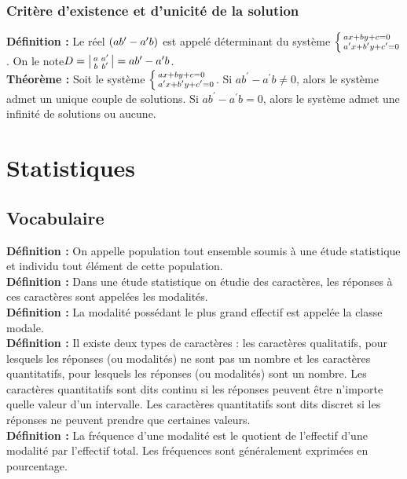 \documentclass[a4paper,titlepage]{article}
\let\oldsection\section
\renewcommand\section{\clearpage\oldsection}
\let\oldleft\left
\renewcommand{\left}{\mathopen{}\mathclose\bgroup\oldleft}
\let\oldright\right
\renewcommand{\right}{\aftergroup\egroup\oldright}
\begin{document}
        \subsubsection{Critère d’existence et d’unicité de la solution}
            \textbf{Définition :} Le réel $\left(ab^{\prime}-a^{\prime}b\right)$ est appelé déterminant du système $\left\{\begin{smallmatrix*}[l]ax+by+c=0\\a^{\prime}x+b^{\prime}y+c^{\prime}=0\end{smallmatrix*}\!\right.$. On le note\linebreak$D=\left|\begin{smallmatrix}a&a^{\prime}\\b&b^{\prime}\end{smallmatrix}\right|=ab^{\prime}-a^{\prime}b$.
            \\
            \textbf{Théorème :} Soit le système $\left\{\begin{smallmatrix*}[l]ax+by+c=0\\a^{\prime}x+b^{\prime}y+c^{\prime}=0\end{smallmatrix*}\!\right.$. Si $ab^{\prime}-a^{\prime}b\neq0$, alors le système admet un unique couple de solutions. Si $ab^{\prime}-a^{\prime}b=0$, alors le système admet une infinité de solutions ou aucune.
\section{Statistiques}
    \subsection{Vocabulaire}
        \textbf{Définition :} On appelle population tout ensemble soumis à une étude statistique et individu tout élément de cette population.
        \\
        \textbf{Définition :} Dans une étude statistique on étudie des caractères, les réponses à ces caractères sont appelées les modalités.
        \\
        \textbf{Définition :} La modalité possédant le plus grand effectif est appelée la classe modale.
        \\
        \textbf{Définition :}  Il existe deux types de caractères : les caractères qualitatifs, pour lesquels les réponses (ou modalités) ne sont pas un nombre et les caractères quantitatifs, pour lesquels les réponses (ou modalités) sont un nombre. Les caractères quantitatifs sont dits continu si les réponses peuvent être n’importe quelle valeur d’un intervalle. Les caractères quantitatifs sont dits discret si les réponses ne peuvent prendre que certaines valeurs.
        \\
        \textbf{Définition :} La fréquence d’une modalité est le quotient de l’effectif d’une modalité par l’effectif total. Les fréquences sont généralement exprimées en pourcentage.
\end{document}
